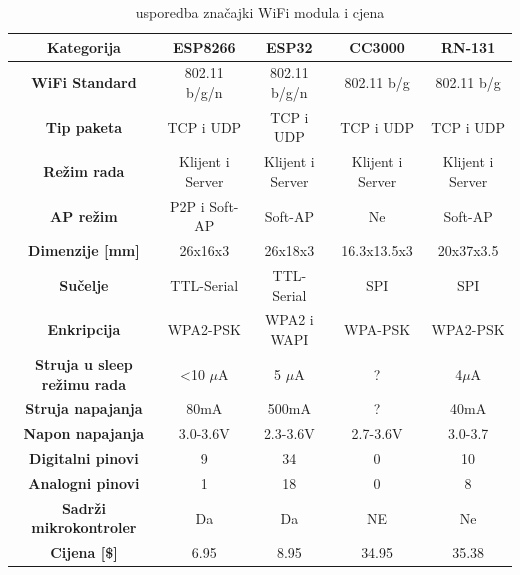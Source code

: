 \documentclass[times, utf8, zavrsni]{fer}
\begin{document}
\begin{center}
    \begin{table}[h]
        \begin{tabular}{ |c||c|c|c|c| }
            \hline
            \textbf{Kategorija} & \textbf{ESP8266} & \textbf{ESP32} & \textbf{CC3000} & \textbf{RN-131} \\
            \hline
            \hline
            \textbf{WiFi Standard} & 802.11 b/g/n & 802.11 b/g/n & 802.11 b/g & 802.11 b/g\\
            \hline
            \textbf{Tip paketa} & TCP i UDP & TCP i UDP & TCP i UDP & TCP i UDP\\
            \hline
            \textbf{Režim rada} & Klijent i Server & Klijent i Server & Klijent i Server & Klijent i Server\\
            \hline
            \textbf{AP režim} & P2P i Soft-AP & Soft-AP & Ne & Soft-AP\\
            \hline
            \textbf{Dimenzije [mm]} & 26x16x3 & 26x18x3 & 16.3x13.5x3 & 20x37x3.5\\
            \hline
            \textbf{Sučelje} & TTL-Serial & TTL-Serial & SPI & SPI\\
            \hline
            \textbf{Enkripcija} & WPA2-PSK & WPA2 i WAPI & WPA-PSK & WPA2-PSK\\
            \hline
            \textbf{Struja u sleep režimu rada} & <10 $\mu$A & 5 $\mu$A & ? & 4$\mu$A\\
            \hline
            \textbf{Struja napajanja} & 80mA & 500mA & ? & 40mA\\
            \hline
            \textbf{Napon napajanja} & 3.0-3.6V & 2.3-3.6V & 2.7-3.6V & 3.0-3.7\\
            \hline
            \textbf{Digitalni pinovi} & 9 & 34 & 0 & 10\\
            \hline
            \textbf{Analogni pinovi} & 1 & 18 & 0 & 8\\
            \hline
            \textbf{Sadrži mikrokontroler} & Da & Da & NE & Ne\\
            \hline
            \textbf{Cijena [\$]} & 6.95 & 8.95 & 34.95 & 35.38\\
            \hline
        \end{tabular}
        \caption{usporedba značajki WiFi modula i cjena}
        \label{tab:usporedba}
    \end{table}
\end{center}
\end{document}
